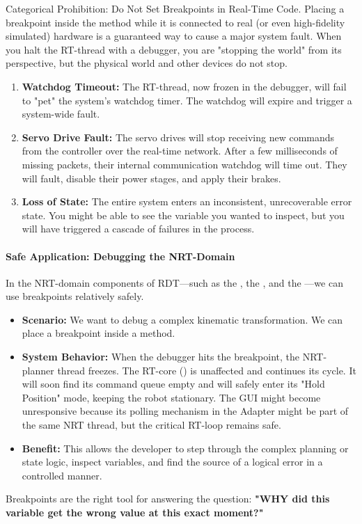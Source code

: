 \begin{dangerbox}{Categorical Prohibition: Do Not Set Breakpoints in Real-Time Code.}
    Placing a breakpoint inside the  method while it is connected to real (or even high-fidelity simulated) hardware is a guaranteed way to cause a major system fault. When you halt the RT-thread with a debugger, you are "stopping the world" from its perspective, but the physical world and other devices do not stop.
    \begin{enumerate}
        \item \textbf{Watchdog Timeout:} The RT-thread, now frozen in the debugger, will fail to "pet" the system's watchdog timer. The watchdog will expire and trigger a system-wide fault.
        \item \textbf{Servo Drive Fault:} The servo drives will stop receiving new commands from the controller over the real-time network. After a few milliseconds of missing packets, their internal communication watchdog will time out. They will fault, disable their power stages, and apply their brakes.
        \item \textbf{Loss of State:} The entire system enters an inconsistent, unrecoverable error state. You might be able to see the variable you wanted to inspect, but you will have triggered a cascade of failures in the process.
    \end{enumerate}
\end{dangerbox}


\paragraph{Safe Application: Debugging the NRT-Domain}
In the NRT-domain components of RDT—such as the , the , and the —we can use breakpoints relatively safely.
\begin{itemize}
    \item \textbf{Scenario:} We want to debug a complex kinematic transformation. We can place a breakpoint inside a  method.
    \item \textbf{System Behavior:} When the debugger hits the breakpoint, the NRT-planner thread freezes. The RT-core () is unaffected and continues its cycle. It will soon find its command queue empty and will safely enter its "Hold Position" mode, keeping the robot stationary. The GUI might become unresponsive because its polling mechanism in the Adapter might be part of the same NRT thread, but the critical RT-loop remains safe.
    \item \textbf{Benefit:} This allows the developer to step through the complex planning or state logic, inspect variables, and find the source of a logical error in a controlled manner.
\end{itemize}
Breakpoints are the right tool for answering the question: \textbf{"WHY did this variable get the wrong value at this exact moment?"}




